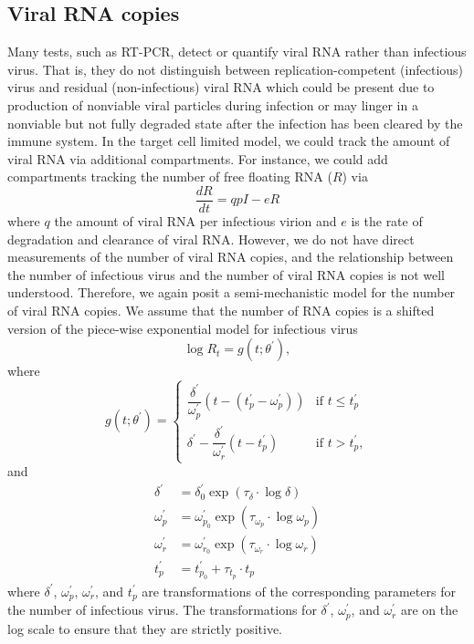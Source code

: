 \documentclass[11pt]{article}
\begin{document}
\subsection{Viral RNA copies}
Many tests, such as RT-PCR, detect or quantify viral RNA rather than infectious virus. That is, they do not distinguish between replication-competent (infectious) virus and residual (non-infectious) viral RNA which could be present due to production of nonviable viral particles during infection or may linger in a nonviable but not fully degraded state after the infection has been cleared by the immune system. In the target cell limited model, we could track the amount of viral RNA via additional compartments. For instance, we could add compartments tracking the number of  free floating RNA ($R$) via 
\begin{equation*}
    \dfrac{dR}{dt} = q p I - e R 
\end{equation*} 
where $q$ the amount of viral RNA per infectious virion and $e$ is the rate of degradation and clearance of viral RNA. However, we do not have direct measurements of the number of viral RNA copies, and the relationship between the number of infectious virus and the number of viral RNA copies is not well understood. Therefore, we again posit a semi-mechanistic model for the number of viral RNA copies. We assume that the number of RNA copies is a shifted version of the piece-wise exponential model for infectious virus
\begin{equation*}
    \log R_t = g(t; \theta^\prime),
\end{equation*}
where
\begin{equation*}
    g(t; \theta^\prime) = \begin{cases}
   \dfrac{\delta^\prime}{\omega^\prime_p} (t - (t^\prime_p - \omega^\prime_p)) & \text{if } t \leq t^\prime_p \\
    \delta^\prime - \dfrac{\delta^\prime}{\omega^\prime_r} (t - t^\prime_p) & \text{if } t > t^\prime_p,
\end{cases}
\end{equation*}
and
\begin{align*}
    \delta^\prime &= \delta^\prime_0 \exp(\tau_{\delta} \cdot \log \delta) \\
    \omega^\prime_{p} &= \omega^\prime_{p_0} \exp(\tau_{\omega_{p}} \cdot \log \omega_{p}) \\
    \omega^\prime_{r} &= \omega^\prime_{r_0} \exp(\tau_{\omega_{r}} \cdot \log \omega_{r}) \\
    t^\prime_{p} &= t^\prime_{p_0} + \tau_{t_p} \cdot t_{p} 
\end{align*}
where $\delta^\prime$, $\omega^\prime_{p}$, $\omega^\prime_{r}$, and $t^\prime_{p}$ are transformations of the corresponding parameters for the number of infectious virus. The transformations for $\delta^\prime$, $\omega^\prime_{p}$, and $\omega^\prime_{r}$ are on the log scale to ensure that they are strictly positive.
\end{document}
